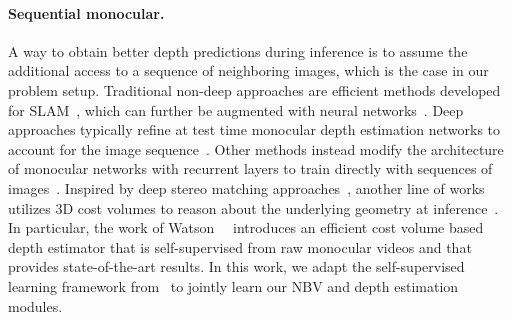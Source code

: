 \paragraph{Sequential monocular.} A way to obtain better depth predictions during inference is to assume the additional access to a sequence of neighboring images, which is the case in our problem setup. Traditional non-deep approaches are efficient methods developed for SLAM~\cite{newcombe2011dtam,newcombe2010live,engel2014lsd,yang2018polarimetric}, which can further be augmented with neural networks~\cite{tateno2017cnn,bloesch2018codeslam,laidlow2019deepfusion}. Deep approaches typically refine at test time monocular depth estimation networks to account for the image sequence~\cite{casser2018depth,chen2019self,luo2020consistent,mccraith2020monocular, shu2020feature,kuznietsov2021comoda}. Other methods instead modify the architecture of monocular networks with recurrent layers to train directly with sequences of images~\cite{kumar2018depthnet, zhang2019exploiting, xie2019video, wang2019recurrent, patil2020dont, wang2020self}.
Inspired by deep stereo matching approaches~\cite{vzbontar2016stereo,luo2016efficient,shaked2017improved,kendall2017end,chang2018pyramid,Zhang2019GANet,cheng2019learning,zhang2019domaininvariant}, another line of works utilizes 3D cost volumes to reason about the underlying geometry at inference~\cite{liu2019neural, hou2019multi, wu2019spatial, wimbauer2020monorec, watson-cvpr21-temporal-opportunist-manydepth, guizilini-cvpr2022-multiframe}. In particular, the work of Watson~\etal~\cite{watson-cvpr21-temporal-opportunist-manydepth} introduces an efficient cost volume based depth estimator that is self-supervised from raw monocular videos and that provides state-of-the-art results. In this work, we adapt the self-supervised learning framework from~\cite{watson-cvpr21-temporal-opportunist-manydepth} to jointly learn our NBV and depth estimation modules.